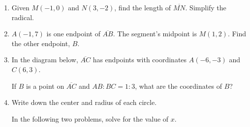 \documentclass[12pt, twoside]{article}
\begin{document}
\begin{enumerate}
  \item Given $M(-1,0)$ and $N(3,-2)$, find the length of $\overline{MN}$. Simplify the radical.
      \vspace{5cm}

  \item $A(-1,7)$ is one endpoint of $\overline{AB}$. The segment's midpoint is $M(1,2)$. Find the other endpoint, $B$.

\newpage

  \item In the diagram below, $\overline{AC}$ has endpoints with coordinates $A(-6,-3)$ and $C(6, 3)$.
    \begin{center} %
    \end{center}
    If $B$ is a point on $\overline{AC}$ and $AB {:} BC = 1{:}3$,  what  are  the coordinates of $B$? \vspace{5cm}

  \item Write down the center and radius of each circle.
    \begin{enumerate}
    \end{enumerate}

\newpage

  In the following two problems, solve for the value of $x$.


\end{enumerate}
\end{document}
